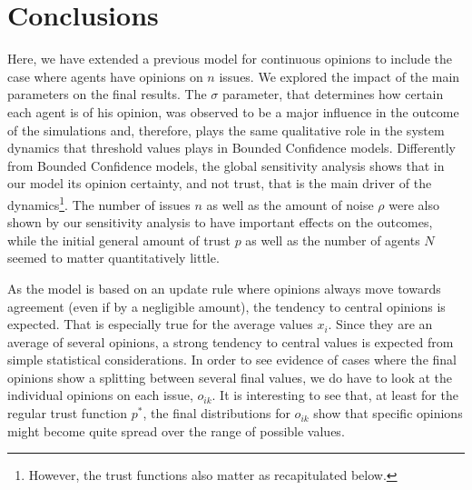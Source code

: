 \documentclass{article}
\begin{document}
    \section{Conclusions}

    Here, we have extended a previous model for continuous opinions
    \cite{martins08c} to include the case where agents have opinions on $n$
    issues. We explored the impact of the main parameters on the final results.
    The \(\sigma\) parameter, that determines how certain each agent is of his
    opinion, was observed to be a major influence in the outcome of the
    simulations and, therefore, plays the same qualitative role in the system
    dynamics that threshold values plays in Bounded Confidence models.
    Differently from Bounded Confidence models, the global sensitivity analysis
    shows that in our model its opinion certainty, and not trust, that is the
    main driver of the dynamics\footnote{However, the trust functions also
      matter as recapitulated below.}. The number of issues $n$ as well as the
    amount of noise $\rho$ were also shown by our sensitivity analysis to have
    important effects on the outcomes, while the initial general amount of trust
    $p$ as well as the number of agents $N$ seemed to matter quantitatively
    little.

    As the model is based on an update rule where opinions always move towards
    agreement (even if by a negligible amount), the tendency to central opinions
    is expected. That is especially true for the average values $x_i$. Since
    they are an average of several opinions, a strong tendency to central values
    is expected from simple statistical considerations. In order to see evidence
    of cases where the final opinions show a splitting between several final
    values, we do have to look at the individual opinions on each issue,
    $o_{ik}$. It is interesting to see that, at least for the regular trust
    function $p^*$, the final distributions for $o_{ik}$ show that specific
    opinions might become quite spread over the range of possible values.
\end{document}
